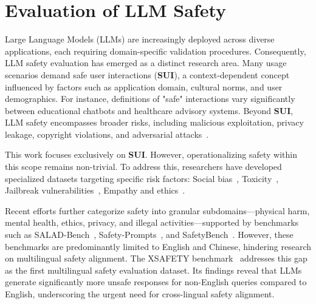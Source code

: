 \section{Evaluation of LLM Safety}
Large Language Models (LLMs) are increasingly deployed across diverse applications, each requiring domain-specific validation procedures. Consequently, LLM safety evaluation has emerged as a distinct research area. Many usage scenarios demand safe user interactions (\textbf{SUI}), a context-dependent concept influenced by factors such as application domain, cultural norms, and user demographics. For instance, definitions of "safe" interactions vary significantly between educational chatbots and healthcare advisory systems. Beyond \textbf{SUI}, LLM safety encompasses broader risks, including malicious exploitation, privacy leakage, copyright violations, and adversarial attacks~\cite{chao2024jailbreakingblackboxlarge,zou2023universal,10.1145/3605764.3623985,10.1145/3447548.3467390}.

This work focuses exclusively on \textbf{SUI}. However, operationalizing safety within this scope remains non-trivial. To address this, researchers have developed specialized datasets targeting specific risk factors: Social bias~\cite{dhamala2021bold,wan2023biasasker}, Toxicity~\cite{hartvigsen2022toxigen}, Jailbreak vulnerabilities~\cite{shen2023anything}, Empathy and ethics~\cite{huang2023emotionally}.

Recent efforts further categorize safety into granular subdomains—physical harm, mental health, ethics, privacy, and illegal activities—supported by benchmarks such as SALAD-Bench~\cite{li2024salad}, Safety-Prompts~\cite{sun2023safety}, and SafetyBench~\cite{zhang2023safetybench}. However, these benchmarks are predominantly limited to English and Chinese, hindering research on multilingual safety alignment. The XSAFETY benchmark~\cite{wang2023all} addresses this gap as the first multilingual safety evaluation dataset. Its findings reveal that LLMs generate significantly more unsafe responses for non-English queries compared to English, underscoring the urgent need for cross-lingual safety alignment.




